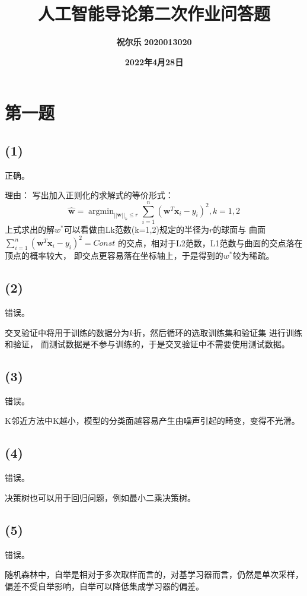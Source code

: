 \documentclass[UTF8]{ctexart}
\title{ \textbf{人工智能导论第二次作业问答题}}
\author{\textbf{祝尔乐}
        \textbf{2020013020}}
\date{\textbf{2022年4月28日}}
\begin{document}
\maketitle

\section{第一题}
\subsection*{(1)}
\noindent
正确。

\noindent
理由：
写出加入正则化的求解式的等价形式：
\begin{equation}
\hat{\textbf{w}} = \mathop{\arg \min}_{||\textbf{w}||_k \le r}
\sum_{i=1}^{n}(\textbf{w}^T \textbf{x}_i - y_i)^2, k=1,2
\end{equation}
\noindent
上式求出的解$w^*$可以看做由Lk范数(k=1,2)规定的半径为$r$的球面与
曲面$\sum_{i=1}^{n}(\textbf{w}^T \textbf{x}_i - y_i)^2 = Const$
的交点，相对于L2范数，L1范数与曲面的交点落在顶点的概率较大，
即交点更容易落在坐标轴上，于是得到的$w^*$较为稀疏。

\subsection*{(2)}
\noindent
错误。

\noindent
交叉验证中将用于训练的数据分为$k$折，然后循环的选取训练集和验证集
进行训练和验证，
而测试数据是不参与训练的，于是交叉验证中不需要使用测试数据。

\subsection*{(3)}
\noindent
错误。

\noindent
K邻近方法中K越小，模型的分类面越容易产生由噪声引起的畸变，变得不光滑。

\subsection*{(4)}
\noindent
错误。

\noindent
决策树也可以用于回归问题，例如最小二乘决策树。

\subsection*{(5)}
\noindent
错误。

\noindent
随机森林中，自举是相对于多次取样而言的，对基学习器而言，仍然是单次采样，
偏差不受自举影响，自举可以降低集成学习器的偏差。
\end{document}
